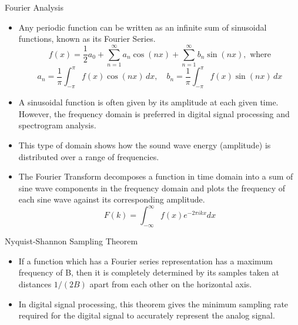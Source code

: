 \documentclass[leqno,presentation]{beamer}
\theoremstyle{definition}
\begin{document}
\begin{frame}
\begin{columns}[t]
\begin{column}{.25\linewidth}
\begin{block}{Fourier Analysis}
\vspace{1ex}
\begin{itemize}
\item Any periodic function can be written as an infinite sum of sinusoidal functions, known as its Fourier Series.
\[ f(x) = \frac{1}{2} a_0 + \sum^\infty_{n = 1}{a_n \cos (nx)} + \sum^\infty_{n = 1}{b_n \sin (nx)}, \text{ where} \]
\[ a_n = \frac{1}{\pi} \int^\pi_{-\pi} f(x) \cos (nx) \, dx, \quad b_n = \frac{1}{\pi} \int^\pi_{-\pi} f(x) \sin (nx) \, dx \]
\item A sinusoidal function is often given by its amplitude at each given time. However, the frequency domain is preferred in digital signal processing and spectrogram analysis.
\item This type of domain shows how the sound wave energy (amplitude) is distributed over a range of frequencies.
\item The Fourier Transform decomposes a function in time domain into a sum of sine wave  components in the frequency domain and plots the frequency of each sine wave against its corresponding amplitude. 
\[ F(k) = \int^\infty_{-\infty} f(x) e^{-2 \pi i k x} dx \]
\end{itemize}
\end{block}

\begin{block}{Nyquist-Shannon Sampling Theorem}
\begin{itemize}
\vspace{1ex}
\item If a function which has a Fourier series representation has a maximum frequency of B, then it is completely determined by its samples taken at distances \( 1/(2B) \) apart from each other on the horizontal axis. 
\item In digital signal processing, this theorem gives the minimum sampling rate required for the digital signal to accurately represent the analog signal. 
\end{itemize}
\end{block}
\end{column}


\end{columns}
\end{frame}
\end{document}
